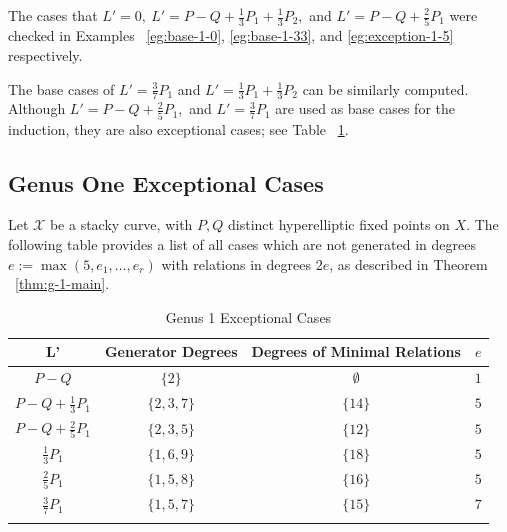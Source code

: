 \documentclass{amsart}
\theoremstyle{plain}
\theoremstyle{definition}
\theoremstyle{remark}
\newtheorem{rem}[thm]{Remark}
\numberwithin{equation}{section}
\newcommand\ssec{\subsection}
\newcommand\sx{\mathscr X}
\begin{document}
The cases that $L' = 0, \: L' = P-Q +\frac{1}{3}P_1 + \frac{1}{3}P_2,$ and $L' = P-Q + \frac{2}{5}P_1$ were checked in Examples ~\ref{eg:base-1-0}, \ref{eg:base-1-33}, and \ref{eg:exception-1-5} respectively.

The base cases of $L' = \frac{3}{7}P_1$ and $L' = \frac{1}{3}P_1 +\frac{1}{3}P_2$ can be similarly computed. Although $L' = P - Q + \frac{2}{5}P_1,$ and $L' = \frac{3}{7}P_1$ are used as base cases for the induction, they are also exceptional cases; see Table ~\ref{table:g-1-exceptional}.

\ssec{Genus One Exceptional Cases}
\label{ssec:g-1-exceptional}
Let $\sx$ be a stacky curve, with $P, Q$ distinct hyperelliptic
fixed points on $X$. The following table provides a list of all
cases which are not generated in degrees $e := \max(5, e_1, \ldots,
e_r)$ with relations in degrees $2e$, as described in Theorem
~\ref{thm:g-1-main}.

\begin{longtable}	{| c || c | c | c |}
	\hline
	L' & Generator Degrees & Degrees of Minimal Relations & $e$ \\
	\hline
	\hline
	$P - Q$ & $\{2\}$ & $\emptyset$ & $1$\\	\hline

	$P - Q + \frac{1}{3} P_1$ & $\{2, 3, 7\}$ & $\{14\}$ & $5$ \\	\hline

	$P - Q + \frac{2}{5} P_1$ & $\{2, 3, 5\}$ & $\{12\}$ & $5$\\	\hline
	
	$\frac{1}{3} P_1$ & $\{1, 6, 9\}$ & $\{18\}$ & $5$ \\	\hline

	$\frac{2}{5} P_1$ & $\{1, 5, 8\}$ & $\{16\}$ & $5$ \\	\hline
	
	$\frac{3}{7} P_1$ & $\{1, 5, 7\}$ & $\{15\}$ & $7$ \\	\hline
	
	\caption{Genus 1 Exceptional Cases}
	\label{table:g-1-exceptional}
	
\end{longtable}

\end{document}

